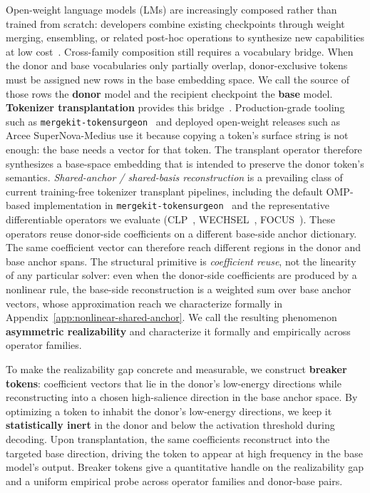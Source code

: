 \documentclass{article}
\theoremstyle{plain}
\theoremstyle{definition}
\theoremstyle{remark}
\begin{document}
Open-weight language models (LMs) are increasingly composed rather than trained from scratch: developers combine existing checkpoints through weight merging, ensembling, or related post-hoc operations to synthesize new capabilities at low cost~\citep{wortsman2022soups,ilharco2022taskarithmetic, mergekit2024, yadav2023ties}.
Cross-family composition still requires a vocabulary bridge. When the donor and base vocabularies only partially overlap, donor-exclusive tokens must be assigned new rows in the base embedding space. We call the source of those rows the \textbf{donor} model and the recipient checkpoint the \textbf{base} model.
\textbf{Tokenizer transplantation} provides this bridge~\citep{goddard2025tftransplant,minixhofer2021wechsel,dobler2023focus,ostendorff2023efficient}. Production-grade tooling such as \texttt{mergekit-tokensurgeon}~\citep{mergekit2024} and deployed open-weight releases such as Arcee SuperNova-Medius use it because copying a token's surface string is not enough: the base needs a vector for that token. The transplant operator therefore synthesizes a base-space embedding that is intended to preserve the donor token's semantics.
\emph{Shared-anchor / shared-basis reconstruction} is a prevailing class of current training-free tokenizer transplant pipelines, including the default OMP-based implementation in \texttt{mergekit-tokensurgeon}~\citep{mergekit2024,goddard2025tftransplant} and the representative differentiable operators we evaluate (CLP~\citep{ostendorff2023efficient}, WECHSEL~\citep{minixhofer2021wechsel}, FOCUS~\citep{dobler2023focus}). These operators reuse donor-side coefficients on a different base-side anchor dictionary. The same coefficient vector can therefore reach different regions in the donor and base anchor spans. The structural primitive is \emph{coefficient reuse}, not the linearity of any particular solver: even when the donor-side coefficients are produced by a nonlinear rule, the base-side reconstruction is a weighted sum over base anchor vectors, whose approximation reach we characterize formally in Appendix~\ref{app:nonlinear-shared-anchor}. We call the resulting phenomenon \textbf{asymmetric realizability} and characterize it formally and empirically across operator families.

To make the realizability gap concrete and measurable, we construct \textbf{breaker tokens}: coefficient vectors that lie in the donor's low-energy directions while reconstructing into a chosen high-salience direction in the base anchor space. By optimizing a token to inhabit the donor's low-energy directions, we keep it \textbf{statistically inert} in the donor and below the activation threshold during decoding. Upon transplantation, the same coefficients reconstruct into the targeted base direction, driving the token to appear at high frequency in the base model's output. Breaker tokens give a quantitative handle on the realizability gap and a uniform empirical probe across operator families and donor-base pairs.
\end{document}
